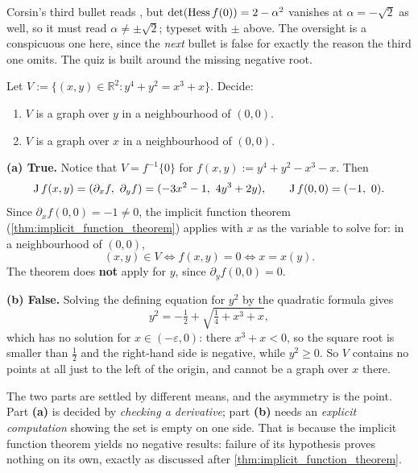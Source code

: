\begin{ainote}
Corsin's third bullet reads , but $\det(\operatorname{Hess} f(0)) = 2-\alpha^2$
vanishes at $\alpha = -\sqrt2$ as well, so it must read $\alpha \neq \pm\sqrt2$; typeset with
$\pm$ above. The oversight is a conspicuous one here, since the \emph{next} bullet is false for
exactly the reason the third one omits. The quiz is built around the missing negative root.

\end{ainote}

\begin{question}
\label{q:quiz_q6}
Let $V := \{(x,y) \in \mathbb{R}^2 : y^4+y^2 = x^3+x\}$. Decide:
\begin{enumerate}[label=\textbf{(\alph*)}]
  \item $V$ is a graph over $y$ in a neighbourhood of $(0,0)$.
  \item $V$ is a graph over $x$ in a neighbourhood of $(0,0)$.
\end{enumerate}
\end{question}

\begin{answer}
\textbf{(a) True.} Notice that $V = f^{-1}\{0\}$ for $f(x,y) := y^4+y^2-x^3-x$. Then
\[\Jac f(x,y) = (\partial_xf,\ \partial_yf) = (-3x^2-1,\ 4y^3+2y), \qquad \Jac f(0,0) = (-1,\ 0).\]
Since $\partial_xf(0,0) = -1 \neq 0$, the implicit function theorem
(\cref{thm:implicit_function_theorem}) applies with $x$ as the variable to solve for: in a
neighbourhood of $(0,0)$,
\[(x,y) \in V \iff f(x,y) = 0 \iff x = x(y).\]
The theorem does \textbf{not} apply for $y$, since $\partial_yf(0,0) = 0$.

\textbf{(b) False.} Solving the defining equation for $y^2$ by the quadratic formula gives
\[y^2 = -\tfrac12 + \sqrt{\tfrac14 + x^3 + x},\]
which has no solution for $x \in (-\varepsilon,0)$: there $x^3+x < 0$, so the square root is
smaller than $\tfrac12$ and the right-hand side is negative, while $y^2 \geq 0$. So $V$ contains
no points at all just to the left of the origin, and cannot be a graph over $x$ there.
\end{answer}

\begin{ainote}
The two parts are settled by different means, and the asymmetry is the point. Part \textbf{(a)}
is decided by \emph{checking a derivative}; part \textbf{(b)} needs an \emph{explicit
computation} showing the set is empty on one side. That is because the implicit function theorem
yields no negative results: failure of its hypothesis proves nothing on its own, exactly as
discussed after \cref{thm:implicit_function_theorem}.
\end{ainote}

